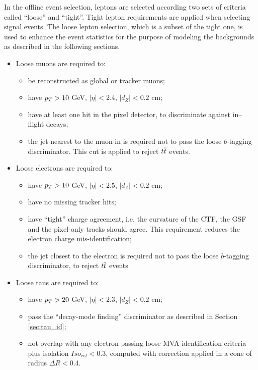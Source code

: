 In the offline event selection, leptons are selected according two sets of criteria called ``loose'' and ``tight''. %
Tight lepton requirements are applied when selecting signal events. The loose lepton selection, which is a subset of the tight one, is used to enhance the event statistics for the purpose of modeling the backgrounds as described in the following sections.

\begin{itemize}
\item Loose muons are required to:
\begin{itemize}
\item be reconstructed as global or tracker muons;
\item have $p_{T} > 10$ GeV, $|\eta| < 2.4$, $|d_Z| < 0.2$ cm;
\item have at least one hit in the pixel detector, to discriminate against in--flight decays;
\item the jet nearest to the muon in \DR is required not to pass the loose $b$-tagging discriminator. This cut is applied to reject $t\overline{t}$ events.
\end{itemize}

\item Loose electrons are required to:
\begin{itemize}
\item have $p_{T} > 10$ GeV, $|\eta| < 2.5$, $|d_Z| < 0.2$ cm;
\item have no missing tracker hits; 
\item have ``tight'' charge agreement, i.e. the curvature of the CTF, the GSF and the pixel-only tracks should agree. This requirement reduces the electron charge mis-identification;
\item the jet closest to the electron is required not to pass the loose $b$-tagging discriminator, to reject $t\overline{t}$ events
\end{itemize}

\item Loose taus are required to:
\begin{itemize}
\item have $p_{T} > 20$ GeV, $|\eta| < 2.3$, $|d_Z| < 0.2$ cm;
\item pass the ``decay-mode finding'' discriminator as described in Section \ref{sec:tau_id}; 
\item not overlap with any electron passing loose MVA identification criteria plus isolation $Iso_{rel} < 0.3$, computed with \db correction applied in a cone of radius $\Delta R < 0.4$.
\end{itemize}

\end{itemize}

